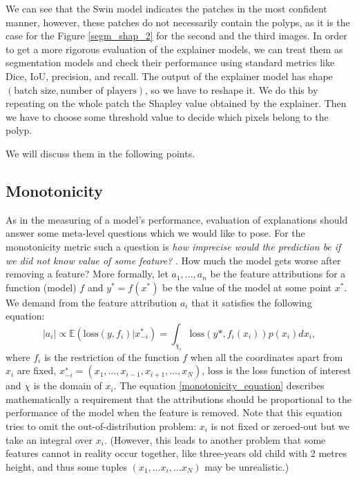 \documentclass[magisterska,en]{pracamgr}
\begin{document}
We can see that the Swin model indicates the patches in the most confident manner, however, these patches do not necessarily contain the polyps, as it is the case for the Figure \ref{segm_shap_2} for the second and the third images. In order to get a more rigorous evaluation of the explainer models, we can treat them as segmentation models and check their performance using standard metrics like Dice, IoU, precision, and recall. The output of the explainer model has shape $(\textrm{batch size}, \textrm{number of players})$, so we have to reshape it. We do this by repeating on the whole patch the Shapley value obtained by the explainer. Then we have to choose some threshold value to decide which pixels belong to the polyp.





We will discuss them in the following points.


\subsection{Monotonicity}
As in the measuring of a model's performance, evaluation of explanations should answer some meta-level questions which we would like to pose. For the monotonicity metric such a question is \textit{how imprecise would the prediction be if we did not know value of some feature?} \cite{DBLP:journals/corr/abs-2007-07584}. How much the model gets worse after removing a feature? More formally, let $a_1, \ldots, a_n$ be the feature attributions for a function (model) $f$ and $y^* = f(x^*)$ be the value of the model at some point $x^*$. We demand from the feature attribution $a_i$ that it satisfies the following equation:
\begin{equation} \label{monotonicity_equation}
    |a_i| \propto  \mathbb{E}\left(\textrm{loss}(y, f_i) | x_{-i}^*\right)  =  \int _{\chi _i} \textrm{loss} \left(y*, f_i(x_i)\right)p(x_i)dx_i ,
\end{equation}
where $f_i$ is the restriction of the function $f$ when all the coordinates apart from $x_i$ are fixed, $x^{∗}_{-i} = (x_1, \ldots, x_{i−1}, x_{i+1}, \ldots, x_N)$,
$\textrm{loss}$ is the loss function of interest and $\chi$ is the domain of $x_i$. The equation \ref{monotonicity_equation} describes mathematically a requirement that the attributions should be proportional to the performance of the model when the feature is removed. Note that this equation tries to omit the out-of-distribution problem: $x_i$ is not fixed or zeroed-out but we take an integral over $x_i$. (However, this leads to another problem that some features cannot in reality occur together, like three-years old child with 2 metres height, and thus some tuples $(x_1, \ldots x_i, \ldots x_N)$ may be unrealistic.)
\end{document}
